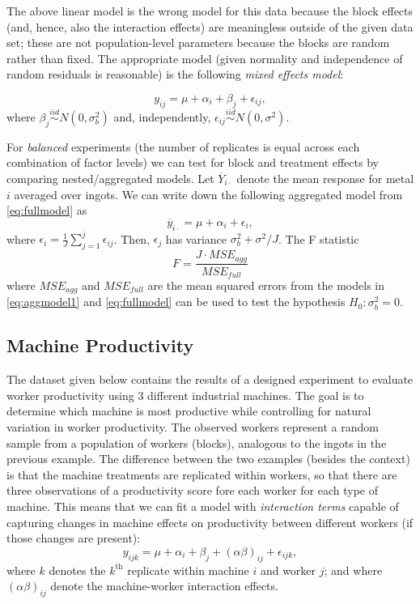 \documentclass[
]{book}
\begin{document}
The above linear model is the wrong model for this data because the block effects (and, hence, also the interaction effects) are meaningless outside of the given data set; these are not population-level parameters because the blocks are random rather than fixed. The appropriate model (given normality and independence of random residuals is reasonable) is the following \emph{mixed effects model}:

\begin{equation}
y_{ij} = \mu + \alpha_i + \beta_j + \epsilon_{ij},
 \label{eq:fullmodel}
\end{equation}
where \(\beta_j\stackrel{iid}{\sim}N(0, \sigma_b^2)\) and, independently, \(\epsilon_{ij}\stackrel{iid}{\sim}N(0,\sigma^2)\).

For \emph{balanced} experiments (the number of replicates is equal across each combination of factor levels) we can test for block and treatment effects by comparing nested/aggregated models. Let \(\overline Y_{i\cdot}\) denote the mean response for metal \(i\) averaged over ingots. We can write down the following aggregated model from \eqref{eq:fullmodel} as
\begin{equation}
\overline y_{i\cdot} = \mu + \alpha_i + \epsilon_{i},
 \label{eq:aggmodel1}
\end{equation}
where \(\epsilon_i = \frac{1}{J}\sum_{j=1}^j \epsilon_{ij}\). Then, \(\epsilon_j\) has variance \(\sigma_b^2 + \sigma^2/J\). The F statistic
\[F = \frac{J\cdot MSE_{agg}}{MSE_{full}}\]
where \(MSE_{agg}\) and \(MSE_{full}\) are the mean squared errors from the models in \eqref{eq:aggmodel1} and \eqref{eq:fullmodel} can be used to test the hypothesis \(H_0:\sigma_b^2 = 0\).

\hypertarget{machine-productivity}{%
\subsection{Machine Productivity}\label{machine-productivity}}

The dataset given below contains the results of a designed experiment to evaluate worker productivity using 3 different industrial machines. The goal is to determine which machine is most productive while controlling for natural variation in worker productivity. The observed workers represent a random sample from a population of workers (blocks), analogous to the ingots in the previous example. The difference between the two examples (besides the context) is that the machine treatments are replicated within workers, so that there are three observations of a productivity score fore each worker for each type of machine. This means that we can fit a model with \emph{interaction terms} capable of capturing changes in machine effects on productivity between different workers (if those changes are present):
\begin{equation}
y_{ijk} = \mu + \alpha_i + \beta_j + (\alpha\beta)_{ij} + \epsilon_{ijk},
 \label{eq:fullmodel2}
\end{equation}
where \(k\) denotes the \(k^{\text{th}}\) replicate within machine \(i\) and worker \(j\); and where \((\alpha\beta)_{ij}\) denote the machine-worker interaction effects.
\end{document}
